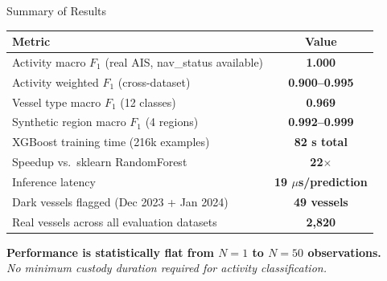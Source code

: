 \documentclass[aspectratio=169,10pt]{beamer}
\begin{document}
\begin{frame}{Summary of Results}
  \begin{center}
    \begin{tabular}{lc}
      \toprule
      Metric & Value \\
      \midrule
      Activity macro $F_1$ (real AIS, nav\_status available) & \textbf{1.000} \\
      Activity weighted $F_1$ (cross-dataset)                & \textbf{0.900--0.995} \\
      Vessel type macro $F_1$ (12 classes)                   & \textbf{0.969} \\
      Synthetic region macro $F_1$ (4 regions)               & \textbf{0.992--0.999} \\
      XGBoost training time (216k examples)                  & \textbf{82 s total} \\
      Speedup vs.\ sklearn RandomForest                      & \textbf{22$\times$} \\
      Inference latency                                      & \textbf{19 $\mu$s/prediction} \\
      Dark vessels flagged (Dec 2023 + Jan 2024)             & \textbf{49 vessels} \\
      Real vessels across all evaluation datasets            & \textbf{2,820} \\
      \bottomrule
    \end{tabular}
  \end{center}

  \bigskip
  \centering
  \textbf{Performance is statistically flat from $N=1$ to $N=50$ observations.}\\
  \textit{No minimum custody duration required for activity classification.}
\end{frame}
\end{document}
